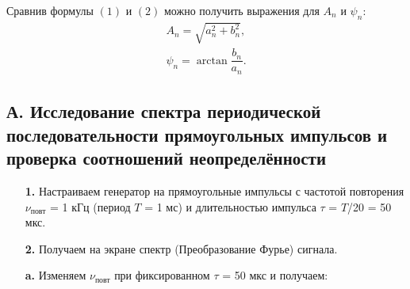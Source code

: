 \documentclass[a4paper,12pt]{article}
\begin{document}
Сравнив формулы $(1)$ и $(2)$ можно получить выражения для $A_n$  и $\psi_n$:
\begin{equation}
\begin{array}{l}
A_n = \sqrt{a_n^2+b_n^2},\\
 \psi_n = \arctan \dfrac{b_n}{a_n}.
\end{array}
\end{equation}
\subsection*{А. Исследование спектра периодической последовательности
прямоугольных импульсов и проверка соотношений неопределённости}

\begin{enumerate}

\item [\textbf{1.}]  Настраиваем генератор на прямоугольные импульсы с частотой повторения $\nu_\text{повт}$ = 1 кГц (период $T$ = 1 мс) и
длительностью импульса $\tau$ = $T$/20 = 50 мкс.

\item [\textbf{2.}] Получаем на экране спектр (Преобразование Фурье) сигнала.

\textbf{a.} Изменяем $\nu_\text{повт}$ при фиксированном $\tau$ = 50 мкс и получаем:


\end{enumerate}
\end{document}

